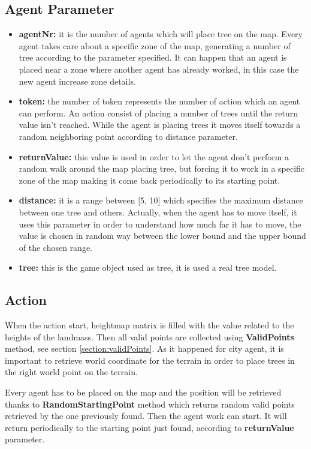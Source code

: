 \documentclass[12pt]{article}
\begin{document}
    \subsection{Agent Parameter}

    \begin{itemize}
        \item \textbf{agentNr:} it is the number of agents which will place tree on the map. Every agent takes care about a specific zone of the map, generating a number of tree
        according to the parameter specified. It can happen that an agent is placed near a zone where another agent has already worked, in this case the new agent increase
        zone details.
        \item \textbf{token:} the number of token represents the number of action which an agent can perform. An action consist of placing a number of trees until the return value
        isn't reached. While the agent is placing trees it moves itself towards a random neighboring point according to distance parameter.
        \item \textbf{returnValue:} this value is used in order to let the agent don't perform a random walk around the map placing tree, but forcing it to work in a specific zone of 
        the map making it come back periodically to its starting point.
        \item \textbf{distance:} it is a range between [5, 10] which specifies the maximum distance between one tree and others. Actually, when the agent has to move itself, it uses this
        parameter in order to understand how much far it has to move, the value is chosen in random way between the lower bound and the upper bound of the chosen range.
        \item \textbf{tree:} this is the game object used as tree, it is used a real tree model.
    \end{itemize}

    \subsection{Action}
    When the action start, heightmap matrix is filled with the value related to the heights of the landmass. Then all valid points are collected using \textbf{ValidPoints} method, see
    section \ref{section:validPoints}. As it happened for city agent, it is important to retrieve world coordinate for the terrain in order to place trees in the right world point on the terrain.

    Every agent has to be placed on the map and the position will be retrieved thanks to \textbf{RandomStartingPoint} method which returns random valid points
    retrieved by the one previously found. Then the agent work can start. It will return periodically to the starting point just found, according to \textbf{returnValue} parameter. 
\end{document}
